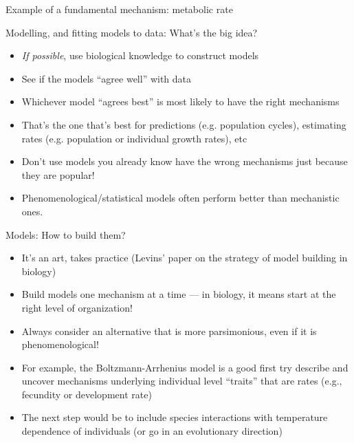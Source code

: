 \documentclass[xcolor=x11names,compress]{beamer}
\renewcommand{\(}{\begin{columns}}
\renewcommand{\)}{\end{columns}}
\newcommand{\<}[1]{\begin{column}{#1}}
\renewcommand{\>}{\end{column}}
\begin{document}
\begin{frame}{Example of a fundamental mechanism: metabolic rate}
\begin{itemize}
\end{itemize}
 
\end{frame}

\begin{frame}{Modelling, and fitting models to data: What's the big idea?}

\begin{itemize} [<+->] \itemsep8pt

	\item {\it If possible}, use biological knowledge to construct models
	\item See if the models ``agree well'' with data
	\item Whichever model ``agrees best'' is most likely to have the right 
	mechanisms
	\item That's the one that's best for predictions (e.g. population 
	cycles), estimating rates (e.g. population or individual growth rates), etc
	\item Don't use models you already know have the wrong mechanisms just because they are popular!
	\item Phenomenological/statistical models often perform better than mechanistic ones.    

\end{itemize}
  
\end{frame}


\begin{frame}{Models: How to build them?}

\begin{itemize}\itemsep10pt

	\item It's an art, takes practice (Levins' paper on the  strategy of model building in biology)
	
	\item Build models one mechanism at a time --- in biology, it means 
	start at the right level of organization! 
	
	\item Always consider an alternative that is more parsimonious, even if 
	it is phenomenological! 

	\item For example, the Boltzmann-Arrhenius model is a good first try 
	describe and uncover mechanisms underlying individual level ``traits'' that are rates (e.g., fecundity or development rate)  

	\item The next step would be to include species interactions with  
	temperature dependence of individuals (or go in an evolutionary direction)

\end{itemize}   

\end{frame}
\end{document}
